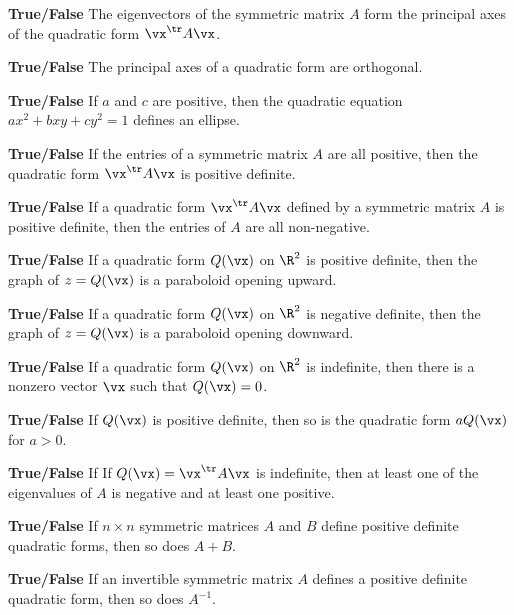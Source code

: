 	\item \textbf{True/False} The eigenvectors of the symmetric matrix $A$ form the principal axes of the quadratic form $\vx^{\tr}A\vx$. 

	\item \textbf{True/False} The principal axes of a quadratic form are orthogonal.

	\item \textbf{True/False} If $a$ and $c$ are positive, then the quadratic equation $ax^2 + bxy + cy^2 = 1$ defines an ellipse.  

	\item \textbf{True/False} If the entries of a symmetric matrix $A$ are all positive, then the quadratic form $\vx^{\tr}A\vx$ is positive definite. 


	\item \textbf{True/False} If a quadratic form $\vx^{\tr}A \vx$ defined by a symmetric matrix $A$ is positive definite, then the entries of $A$ are all non-negative. 


\item \textbf{True/False} If a quadratic form $Q(\vx)$ on $\R^2$ is positive definite, then the graph of $z=Q(\vx)$ is a paraboloid opening upward.

\item \textbf{True/False} If a quadratic form $Q(\vx)$ on $\R^2$ is negative definite, then the graph of $z=Q(\vx)$ is a paraboloid opening downward.

\item \textbf{True/False} If a quadratic form $Q(\vx)$ on $\R^2$ is indefinite, then there is a nonzero vector $\vx$ such that $Q(\vx) = 0$. 

\item \textbf{True/False} If $Q(\vx)$ is positive definite, then so is the quadratic form $aQ(\vx)$ for $a>0$.

\item \textbf{True/False} If If $Q(\vx)=\vx^\tr A\vx$ is indefinite, then at least one of the eigenvalues of $A$ is negative and at least one positive.

\item \textbf{True/False} If $n \times n$ symmetric matrices $A$ and $B$ define positive definite quadratic forms, then so does $A+B$.

\item \textbf{True/False} If an invertible symmetric matrix $A$ defines a positive definite quadratic form, then so does $A^{-1}$.



